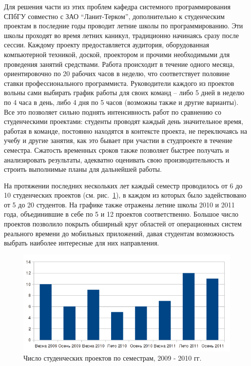 \documentclass[a4paper]{article}
\begin{document}
Для решения части из этих проблем кафедра системного программирования СПбГУ совместно с ЗАО ``Ланит-Терком'', дополнительно к студенческим проектам в последние годы проводит летние школы по программированию. Эти школы проходят во время летних каникул, традиционно начинаясь сразу после сессии. Каждому проекту предоставляется аудитория, оборудованная компьютерной техникой, доской, проектором и прочими необходимыми для проведения занятий средствами. Работа происходит в течение одного месяца, ориентировочно по 20 рабочих часов в неделю, что соответствует половине ставки профессионального программиста. Руководители каждого из проектов вольны сами выбирать график работы для своих команд --  либо 5 дней в неделю по 4 часа в день, либо 4 дня по 5 часов (возможны также и другие варианты). Все это позволяет сильно поднять интенсивность работ по сравнению со студенческими проектами: студенты проводят каждый день значительное время, работая в команде, постоянно находятся в контексте проекта, не переключаясь на учебу и другие занятия, как это бывает при участии в студпроекте в течение семестра. Сжатость временных сроков также позволяет быстрее получать и анализировать результаты, адекватно оценивать свою производительность и строить выполнимые планы для дальнейшей работы. 

На протяжении последних нескольких лет каждый семестр проводилось от 6 до 10 студенческих проектов (см. рис.~\ref{projects}), в каждом из которых было задействовано от 5 до 20 студентов. На графике также отражены летние школы 2010 и 2011 года, объединившие в себе по 5 и 12 проектов соответственно. Большое число проектов позволило покрыть обширный круг областей от операционных систем реального времени до мобильных приложений, давая студентам возможность выбрать наиболее интересные для них направления.

\begin{figure} [ht]
  \begin{center}
    \includegraphics[width=1\textwidth]{01-projects.png}
    \caption{Число студенческих проектов по семестрам, 2009 - 2010 гг.}
    \label{projects}
  \end{center}
\end{figure}
\end{document}
